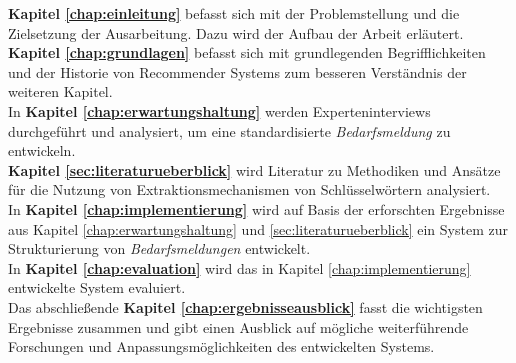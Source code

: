 \textbf{Kapitel \ref{chap:einleitung} } befasst sich mit der Problemstellung und die Zielsetzung der Ausarbeitung. Dazu wird der Aufbau der Arbeit erläutert.\\

\textbf{Kapitel \ref{chap:grundlagen} } befasst sich mit grundlegenden Begrifflichkeiten und der Historie von Recommender Systems zum besseren Verständnis der weiteren Kapitel. \\

In \textbf{Kapitel \ref{chap:erwartungshaltung} } werden Experteninterviews durchgeführt und analysiert, um eine standardisierte \emph{Bedarfsmeldung} zu entwickeln. \\

\textbf{Kapitel \ref{sec:literaturueberblick} } wird Literatur zu Methodiken und Ansätze für die Nutzung von Extraktionsmechanismen von Schlüsselwörtern analysiert. \\

In \textbf{Kapitel \ref{chap:implementierung} } wird auf Basis der erforschten Ergebnisse aus Kapitel \ref{chap:erwartungshaltung} und \ref{sec:literaturueberblick} ein System zur Strukturierung von \emph{Bedarfsmeldungen} entwickelt. \\

In \textbf{Kapitel \ref{chap:evaluation} } wird das in Kapitel \ref{chap:implementierung} entwickelte System evaluiert. \\

Das abschließende \textbf{Kapitel \ref{chap:ergebnisseausblick} } fasst die wichtigsten Ergebnisse zusammen und gibt einen Ausblick auf mögliche weiterführende Forschungen und Anpassungsmöglichkeiten des entwickelten Systems. \\
\newpage
